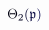 \documentclass[12pt]{article}
\begin{document}
\makeatletter
\renewcommand*{\@textcolor}[3]{%
  \protect\leavevmode
  \begingroup
    \color#1{#2}#3%
  \endgroup
}
\makeatother
\begin{displaymath}
\mathcolor[RGB]{0,0,15}{\Theta} _ { \mathcolor[RGB]{0,0,30}{2} } \mathcolor[RGB]{0,0,45}{(} \mathfrak { \mathcolor[RGB]{0,0,60}{p} } \mathcolor[RGB]{0,0,75}{)}
\end{displaymath}
\end{document}
